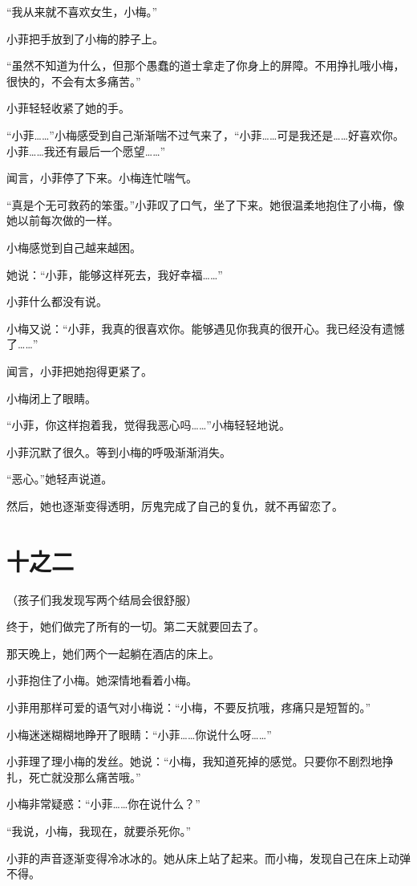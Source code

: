 \documentclass[12pt,a4paper]{ctexart}
\begin{document}
“我从来就不喜欢女生，小梅。”

小菲把手放到了小梅的脖子上。

“虽然不知道为什么，但那个愚蠢的道士拿走了你身上的屏障。不用挣扎哦小梅，很快的，不会有太多痛苦。”

小菲轻轻收紧了她的手。

“小菲……”小梅感受到自己渐渐喘不过气来了，“小菲……可是我还是……好喜欢你。小菲……我还有最后一个愿望……”

闻言，小菲停了下来。小梅连忙喘气。

“真是个无可救药的笨蛋。”小菲叹了口气，坐了下来。她很温柔地抱住了小梅，像她以前每次做的一样。

小梅感觉到自己越来越困。

她说：“小菲，能够这样死去，我好幸福……”

小菲什么都没有说。

小梅又说：“小菲，我真的很喜欢你。能够遇见你我真的很开心。我已经没有遗憾了……”

闻言，小菲把她抱得更紧了。

小梅闭上了眼睛。

“小菲，你这样抱着我，觉得我恶心吗……”小梅轻轻地说。

小菲沉默了很久。等到小梅的呼吸渐渐消失。

“恶心。”她轻声说道。

然后，她也逐渐变得透明，厉鬼完成了自己的复仇，就不再留恋了。

\section*{十之二}

（孩子们我发现写两个结局会很舒服）

终于，她们做完了所有的一切。第二天就要回去了。

那天晚上，她们两个一起躺在酒店的床上。

小菲抱住了小梅。她深情地看着小梅。

小菲用那样可爱的语气对小梅说：“小梅，不要反抗哦，疼痛只是短暂的。”

小梅迷迷糊糊地睁开了眼睛：“小菲……你说什么呀……”

小菲理了理小梅的发丝。她说：“小梅，我知道死掉的感觉。只要你不剧烈地挣扎，死亡就没那么痛苦哦。”

小梅非常疑惑：“小菲……你在说什么？”

“我说，小梅，我现在，就要杀死你。”

小菲的声音逐渐变得冷冰冰的。她从床上站了起来。而小梅，发现自己在床上动弹不得。
\end{document}
